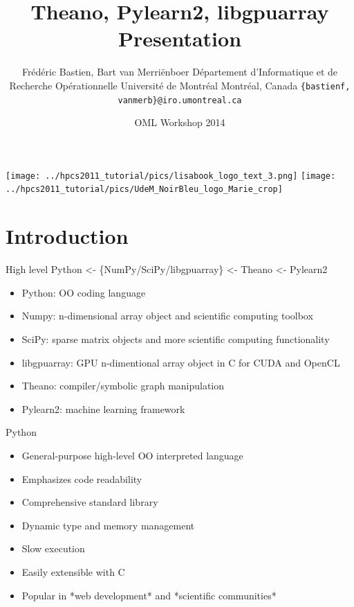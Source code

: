 \documentclass[utf8x,xcolor=pdftex,dvipsnames,table]{beamer}
\title{Theano, Pylearn2, libgpuarray Presentation}
\author{%
\footnotesize
Frédéric Bastien\superscript{a}, Bart van Merriënboer\superscript{a} \newline
\superscript{a}Département d'Informatique et de Recherche Opérationnelle \newline
Université de Montréal \newline
Montréal, Canada \newline
\texttt{\{bastienf, vanmerb\}@iro.umontreal.ca} \newline \newline
}
\date{OML Workshop 2014}
\begin{document}
\begin{frame}[plain]
 \titlepage
 \vspace{-5em}
 \texttt{[image: ../hpcs2011\_tutorial/pics/lisabook\_logo\_text\_3.png]}
 \hfill
 \texttt{[image: ../hpcs2011\_tutorial/pics/UdeM\_NoirBleu\_logo\_Marie\_crop]}
\end{frame}

\section{Introduction}
\begin{frame}{High level}\setcounter{page}{1}
  Python <- \{NumPy/SciPy/libgpuarray\} <- Theano <- Pylearn2
  \begin{itemize}
  \item Python: OO coding language
  \item Numpy: n-dimensional array object and scientific computing toolbox
  \item SciPy: sparse matrix objects and more scientific computing functionality
  \item libgpuarray: GPU n-dimentional array object in C for CUDA and OpenCL
  \item Theano: compiler/symbolic graph manipulation
  \item Pylearn2: machine learning framework
  \end{itemize}
\end{frame}

\begin{frame}{Python}
  \begin{itemize}
  \item General-purpose high-level OO interpreted language
  \item Emphasizes code readability
  \item Comprehensive standard library
  \item Dynamic type and memory management
  \item Slow execution
  \item Easily extensible with C
  \item Popular in *web development* and *scientific communities*
  \end{itemize}
\end{frame}
\end{document}
